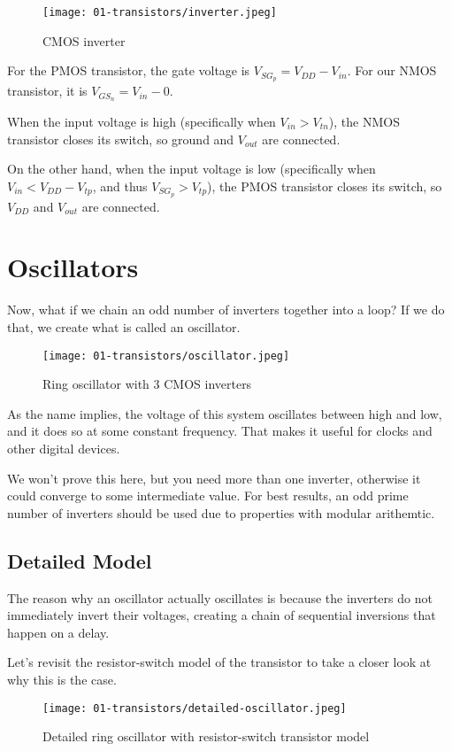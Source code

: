 \documentclass[11pt]{article}
\begin{document}
\begin{figure}[H]
    \centering
        \texttt{[image: 01-transistors/inverter.jpeg]}
    \caption{CMOS inverter}
\end{figure}

For the PMOS transistor, the gate voltage is $V_{SG_p}=V_{DD}-V_{in}$. For our NMOS transistor, it is $V_{GS_n}=V_{in}-0$. 

When the input voltage is high (specifically when $V_{in}>V_{tn}$), the NMOS transistor closes its switch, so ground and $V_{out}$ are connected.

On the other hand, when the input voltage is low (specifically when $V_{in}<V_{DD}-V_{tp}$, and thus $V_{SG_p}>V_{tp}$), the PMOS transistor closes its switch, so $V_{DD}$ and $V_{out}$ are connected.

\section{Oscillators}

Now, what if we chain an odd number of inverters together into a loop? If we do that, we create what is called an oscillator. 

\begin{figure}[H]
    \centering
        \texttt{[image: 01-transistors/oscillator.jpeg]}
    \caption{Ring oscillator with 3 CMOS inverters}
\end{figure}

As the name implies, the voltage of this system oscillates between high and low, and it does so at some constant frequency. That makes it useful for clocks and other digital devices.

We won't prove this here, but you need more than one inverter, otherwise it could converge to some intermediate value. For best results, an odd prime number of inverters should be used due to properties with modular arithemtic. 

\subsection{Detailed Model}
The reason why an oscillator actually oscillates is because the inverters do not immediately invert their voltages, creating a chain of sequential inversions that happen on a delay. 

Let's revisit the resistor-switch model of the transistor to take a closer look at why this is the case. 

\begin{figure}[H]
    \centering
        \texttt{[image: 01-transistors/detailed-oscillator.jpeg]}
    \caption{Detailed ring oscillator with resistor-switch transistor model}
\end{figure}
\end{document}
